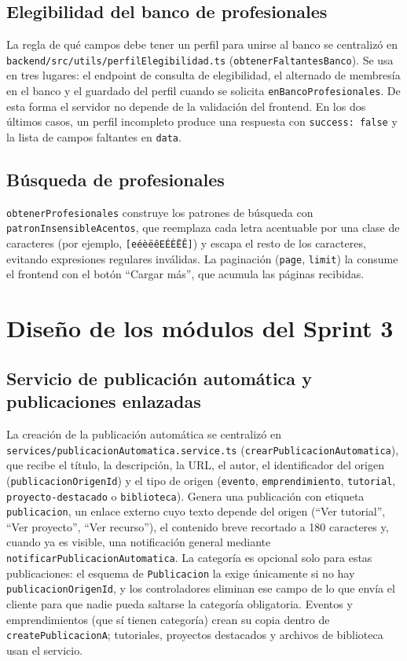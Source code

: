 \subsection{Elegibilidad del banco de profesionales}
La regla de qué campos debe tener un perfil para unirse al banco se centralizó en \texttt{backend/src/utils/perfilElegibilidad.ts} (\texttt{obtenerFaltantesBanco}). Se usa en tres lugares: el endpoint de consulta de elegibilidad, el alternado de membresía en el banco y el guardado del perfil cuando se solicita \texttt{enBancoProfesionales}. De esta forma el servidor no depende de la validación del frontend. En los dos últimos casos, un perfil incompleto produce una respuesta con \texttt{success: false} y la lista de campos faltantes en \texttt{data}.

\subsection{Búsqueda de profesionales}
\texttt{obtenerProfesionales} construye los patrones de búsqueda con \texttt{patronInsensibleAcentos}, que reemplaza cada letra acentuable por una clase de caracteres (por ejemplo, \texttt{[eéèëêEÉÈËÊ]}) y escapa el resto de los caracteres, evitando expresiones regulares inválidas. La paginación (\texttt{page}, \texttt{limit}) la consume el frontend con el botón ``Cargar más'', que acumula las páginas recibidas.

\section{Diseño de los módulos del Sprint 3}

\subsection{Servicio de publicación automática y publicaciones enlazadas}
La creación de la publicación automática se centralizó en \texttt{services/publicacionAutomatica.service.ts} (\texttt{crearPublicacionAutomatica}), que recibe el título, la descripción, la URL, el autor, el identificador del origen (\texttt{publicacionOrigenId}) y el tipo de origen (\texttt{evento}, \texttt{emprendimiento}, \texttt{tutorial}, \texttt{proyecto-destacado} o \texttt{biblioteca}). Genera una publicación con etiqueta \texttt{publicacion}, un enlace externo cuyo texto depende del origen (``Ver tutorial'', ``Ver proyecto'', ``Ver recurso''), el contenido breve recortado a 180 caracteres y, cuando ya es visible, una notificación general mediante \texttt{notificarPublicacionAutomatica}. La categoría es opcional solo para estas publicaciones: el esquema de \texttt{Publicacion} la exige únicamente si no hay \texttt{publicacionOrigenId}, y los controladores eliminan ese campo de lo que envía el cliente para que nadie pueda saltarse la categoría obligatoria. Eventos y emprendimientos (que sí tienen categoría) crean su copia dentro de \texttt{createPublicacionA}; tutoriales, proyectos destacados y archivos de biblioteca usan el servicio.

